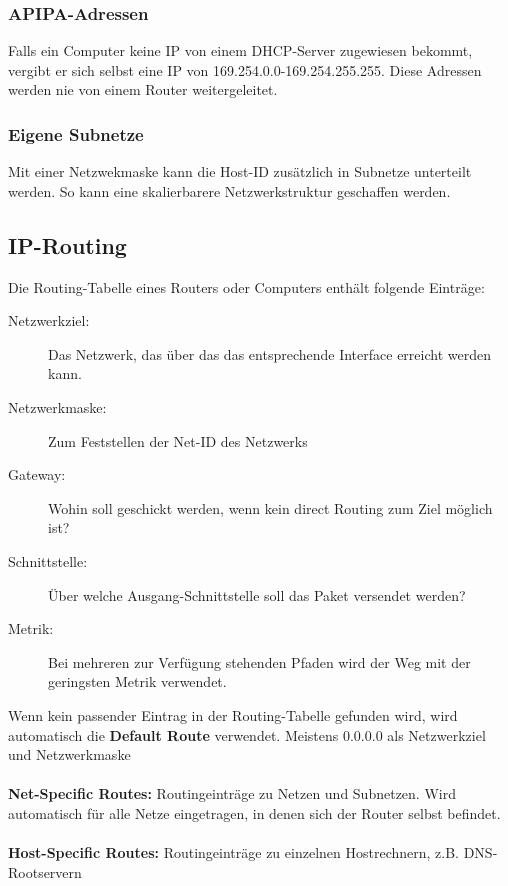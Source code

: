 \documentclass[a4paper,10pt]{scrartcl}
\begin{document}
    \subsubsection{APIPA-Adressen}
        Falls ein Computer keine IP von einem DHCP-Server zugewiesen bekommt, vergibt er sich selbst eine IP von 169.254.0.0-169.254.255.255. Diese Adressen werden nie von einem Router weitergeleitet.
    \subsubsection{Eigene Subnetze}
        Mit einer Netzwekmaske kann die Host-ID zusätzlich in Subnetze unterteilt werden. So kann eine skalierbarere Netzwerkstruktur geschaffen werden.
    \subsection{IP-Routing}
        Die Routing-Tabelle eines Routers oder Computers enthält folgende Einträge:
        \begin{description}
        \item[Netzwerkziel:] Das Netzwerk, das über das das entsprechende Interface erreicht werden kann.
        \item[Netzwerkmaske:] Zum Feststellen der Net-ID des Netzwerks
        \item[Gateway:] Wohin soll geschickt werden, wenn kein direct Routing zum Ziel möglich ist?
        \item[Schnittstelle:] Über welche Ausgang-Schnittstelle soll das Paket versendet werden?
        \item[Metrik:] Bei mehreren zur Verfügung stehenden Pfaden wird der Weg mit der geringsten Metrik verwendet.
        \end{description}
        Wenn kein passender Eintrag in der Routing-Tabelle gefunden wird, wird automatisch die \textbf{Default Route} verwendet. Meistens 0.0.0.0 als Netzwerkziel und Netzwerkmaske\\ \\
        \textbf{Net-Specific Routes:} Routingeinträge zu Netzen und Subnetzen. Wird automatisch für alle Netze eingetragen, in denen sich der Router selbst befindet.\\ \\
        \textbf{Host-Specific Routes:} Routingeinträge zu einzelnen Hostrechnern, z.B. DNS-Rootservern
\end{document}
